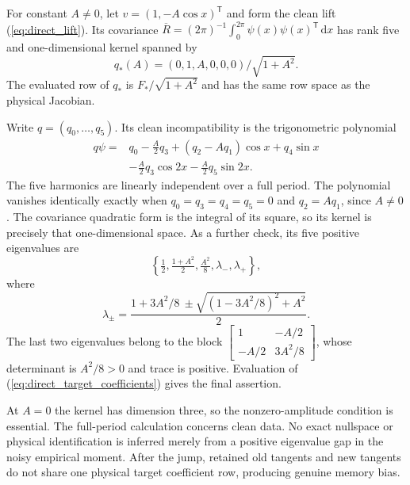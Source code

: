 \documentclass[journal]{IEEEtran}
\newcommand{\dd}{\,\mathrm d}
\begin{document}
\begin{directproposition}
\label{prop:direct_nullspace}
For constant $A\ne0$, let $v=(1,-A\cos x)^{\mathsf T}$ and form the
clean lift (\ref{eq:direct_lift}). Its covariance
$\overline R=(2\pi)^{-1}\int_0^{2\pi}\psi(x)\psi(x)^{\mathsf T}\dd x$
has rank five and one-dimensional kernel spanned by
\begin{equation}
 q_*(A)=(0,1,A,0,0,0)/\sqrt{1+A^2}.
 \label{eq:direct_target_coefficients}
\end{equation}
The evaluated row of $q_*$ is $F_*/\sqrt{1+A^2}$ and has the same row
space as the physical Jacobian.
\end{directproposition}
\begin{IEEEproof}
Write $q=(q_0,\ldots,q_5)$. Its clean incompatibility is the trigonometric
polynomial
\begin{align*}
 q\psi={}&q_0-\tfrac A2q_3+(q_2-Aq_1)\cos x+q_4\sin x\\
 &-\tfrac A2q_3\cos2x-\tfrac A2q_5\sin2x.
\end{align*}
The five harmonics are linearly independent over a full period. The
polynomial vanishes identically exactly when
$q_0=q_3=q_4=q_5=0$ and $q_2=Aq_1$, since $A\ne0$.
The covariance quadratic form is the integral of its square, so its
kernel is precisely that one-dimensional space. As a further check, its
five positive eigenvalues are
\begin{equation}
 \left\{\tfrac12,\tfrac{1+A^2}{2},\tfrac{A^2}{8},\lambda_-,\lambda_+\right\},
\end{equation}
where
\begin{equation}
 \lambda_\pm=\frac{1+3A^2/8\ \pm
 \sqrt{(1-3A^2/8)^2+A^2}}{2}.
\end{equation}
The last two eigenvalues belong to the block
$\left[\begin{smallmatrix}1&-A/2\\-A/2&3A^2/8\end{smallmatrix}\right]$,
whose determinant is $A^2/8>0$ and trace is positive. Evaluation of
(\ref{eq:direct_target_coefficients}) gives the final assertion.
\end{IEEEproof}
At $A=0$ the kernel has dimension three, so the nonzero-amplitude
condition is essential. The full-period calculation concerns clean
data. No exact nullspace or physical identification is inferred merely
from a positive eigenvalue gap in the noisy empirical moment. After the
jump, retained old tangents and new tangents do not share one physical
target coefficient row, producing genuine memory bias.
\end{document}
